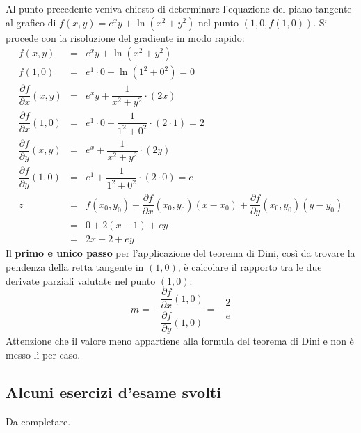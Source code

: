 \documentclass[a4paper]{article}
\begin{document}
	\noindent
	Al punto precedente veniva chiesto di determinare l'equazione del piano tangente al grafico di $f\left(x,y\right) = e^{x}y + \ln\left(x^{2} + y^{2}\right)$ nel punto $\left(1,0,f\left(1,0\right)\right)$. Si procede con la risoluzione del gradiente in modo rapido:\
	\begin{equation*}
		\begin{array}{rcl}
			f\left(x,y\right) &=& e^{x}y + \ln\left(x^{2} + y^{2}\right) \\ [1em]
			f\left(1,0\right) &=& e^{1} \cdot 0 + \ln\left(1^{2} + 0^{2}\right) = 0 \\ [1em]
			\dfrac{\partial f}{\partial x}\left(x,y\right) &=& e^{x}y + \dfrac{1}{x^{2} + y^{2}} \cdot \left(2x\right) \\ [1.5em]
			\dfrac{\partial f}{\partial x}\left(1,0\right) &=& e^{1}\cdot 0 + \dfrac{1}{1^{2} + 0^{2}} \cdot \left(2 \cdot 1\right) = 2 \\ [2em]
			\dfrac{\partial f}{\partial y}\left(x,y\right) &=& e^{x} + \dfrac{1}{x^{2} + y^{2}} \cdot \left(2y\right) \\ [1.5em]
			\dfrac{\partial f}{\partial y}\left(1,0\right) &=& e^{1} + \dfrac{1}{1^{2} + 0^{2}} \cdot \left(2 \cdot 0\right) = e \\ [2em]
			z &=& f\left(x_{0},y_{0}\right) + \dfrac{\partial f}{\partial x}\left(x_{0}, y_{0}\right)\left(x-x_{0}\right) + \dfrac{\partial f}{\partial y}\left(x_{0}, y_{0}\right)\left(y-y_{0}\right) \\ [1em]
			&=& 0 + 2\left(x-1\right) + ey \\
			&=& 2x -2 + ey
		\end{array}
	\end{equation*}
	Il \textbf{primo e unico passo} per l'applicazione del teorema di Dini, così da trovare la pendenza della retta tangente in $\left(1,0\right)$, è calcolare il rapporto tra le due derivate parziali valutate nel punto $\left(1,0\right)$:
	\begin{equation*}
		m = - \dfrac{\dfrac{\partial f}{\partial x}\left(1,0\right)}{\dfrac{\partial f}{\partial y}\left(1,0\right)} = - \dfrac{2}{e}
	\end{equation*}
	Attenzione che il valore meno appartiene alla formula del teorema di Dini e non è messo lì per caso.\newpage

	\subsection{Alcuni esercizi d'esame svolti}
	Da completare.
\end{document}
